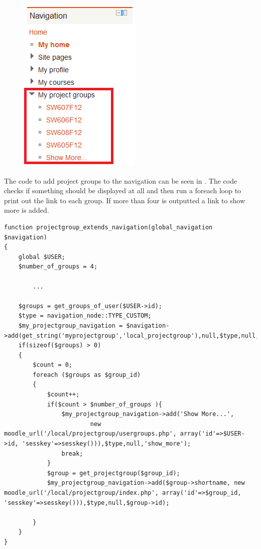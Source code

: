 \begin{figure}
	\centering
		\includegraphics{images/moodlenavigationblock.png}
	\label{fig:moodlenavigationblock}
\end{figure}
The code to add project groups to the navigation can be seen in . The code checks if something should be displayed at all and then run a foreach loop to print out the link to each group. 
If more than four is outputted a link to show more is added. 


\begin{lstlisting}[style=phpCode, caption=\myCaption{The code for extending the navigation}, label=moodlecodeextendingnavigation]
function projectgroup_extends_navigation(global_navigation $navigation) 
{
    global $USER;
    $number_of_groups = 4;
    
		...
    
    $groups = get_groups_of_user($USER->id);
    $type = navigation_node::TYPE_CUSTOM;
    $my_projectgroup_navigation = $navigation->add(get_string('myprojectgroup','local_projectgroup'),null,$type,null,'myprojectgroup');
    if(sizeof($groups) > 0)
    {
        $count = 0;
        foreach ($groups as $group_id) 
        {
            $count++;
            if($count > $number_of_groups ){
                $my_projectgroup_navigation->add('Show More...', 
                        new moodle_url('/local/projectgroup/usergroups.php', array('id'=>$USER->id, 'sesskey'=>sesskey())),$type,null,'show_more');
                break;
            }
            $group = get_projectgroup($group_id);
            $my_projectgroup_navigation->add($group->shortname, new moodle_url('/local/projectgroup/index.php', array('id'=>$group_id, 'sesskey'=>sesskey())),$type,null,$group->id);
            
        }
    }
}
\end{lstlisting}




















